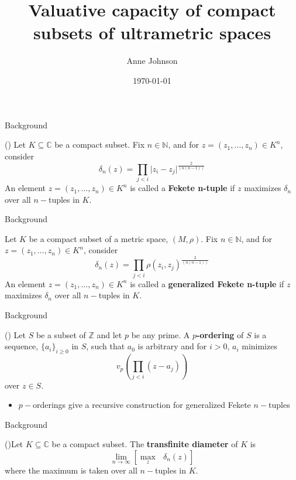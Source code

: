 \documentclass{beamer}
\title{Valuative capacity of compact subsets of ultrametric spaces}
\author{Anne Johnson}
\date{\today}
\theoremstyle{definition}
\begin{document}
\maketitle

\begin{frame}{Background}
\begin{definition}	
(\cite{fek}) Let $K \subseteq \mathbb{C}$ be a compact subset. Fix $n \in \mathbb{N}$, and for $z = (z_1,\ldots,z_n) \in K^n$, consider
\[\delta_n(z) = \prod_{j < i} \lvert z_i - z_j \rvert^{\frac{2}{(n(n-1))}} \]
An element $z = (z_1,\ldots,z_n) \in K^n$ is called a \textbf{Fekete n-tuple} if $z$ maximizes $\delta_n$ over all $n-$tuples in $K$.
\end{definition}
\end{frame}

\begin{frame}{Background}
	\begin{definition}	
		\cite{fek} Let $K$ be a compact subset of a metric space, $(M,\rho)$. Fix $n \in \mathbb{N}$, and for $z = (z_1,\ldots,z_n) \in K^n$, consider
		\[\delta_n(z) = \prod_{j < i} \rho(z_i, z_j)^{\frac{2}{(n(n-1))}} \]
		An element $z = (z_1,\ldots,z_n) \in K^n$ is called a \textbf{generalized Fekete n-tuple} if $z$ maximizes $\delta_n$ over all $n-$tuples in $K$.
	\end{definition}
\end{frame}

\begin{frame}{Background}
 \begin{definition}
		(\cite{mb1}) Let $S$ be a subset of $\mathbb{Z}$  and let $p$ be any prime. A \textbf{$p$-ordering} of $S$ is a sequence, $\{a_i\}_{i\geq 0}$ in $S$, such that $a_0$ is arbitrary and for $i >0$, $a_i$ minimizes 
		\[ v_p (\prod_{j < i} (z - a_j) )\] over $z \in S$.\\
 \end{definition}
	\pause
 \begin{itemize}
		\item $p-$orderings give a recursive construction for generalized Fekete $n-$tuples\only<+->{!}  
 \end{itemize}	
\end{frame}

\begin{frame}{Background}
\begin{definition}	
	(\cite{fek})Let $K \subseteq \mathbb{C}$ be a compact subset. The \textbf{transfinite diameter} of $K$ is \[ \lim_{n\to\infty} [ \max_z \text{ } \delta_n(z)]\] where the maximum is taken over all $n-$tuples in $K$. %
\end{definition}
\end{frame}
\end{document}
